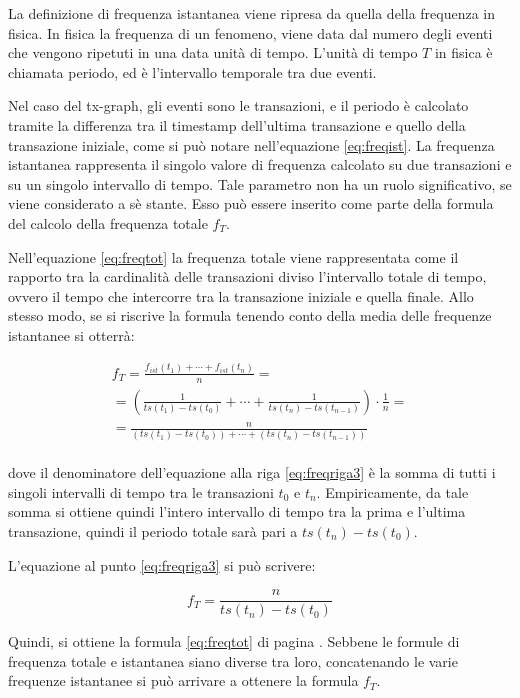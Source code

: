 La definizione di frequenza istantanea viene ripresa da quella della frequenza in fisica. In fisica la frequenza di un fenomeno, viene data dal numero degli eventi che vengono ripetuti in una data unità di tempo. L'unità di tempo $T$ in fisica è chiamata periodo, ed è l'intervallo temporale tra due eventi.

Nel caso del tx-graph, gli eventi sono le transazioni, e il periodo è calcolato tramite la differenza tra il timestamp dell'ultima transazione e quello della transazione iniziale, come si può notare nell'equazione \ref{eq:freqist}. La frequenza istantanea rappresenta il singolo valore di frequenza calcolato su due transazioni e su un singolo intervallo di tempo. Tale parametro non ha un ruolo significativo, se viene considerato a sè stante. Esso può essere inserito come parte della formula del calcolo della frequenza totale $f_T$. 

Nell'equazione \ref{eq:freqtot} la frequenza totale viene rappresentata come il rapporto tra la cardinalità delle transazioni diviso l'intervallo totale di tempo, ovvero il tempo che intercorre tra la transazione iniziale e quella finale. Allo stesso modo, se si riscrive la formula tenendo conto della media delle frequenze istantanee si otterrà:


\begin{eqnarray}
	f_T = \frac{f_{ist}(t_1)+\cdots+f_{ist}(t_n)}{n} = \label{eq:freqriga1} \\[20pt]
	= \left( \frac{1}{ts(t_1) - ts(t_0)}+\cdots+\frac{1}{ ts(t_n) - ts(t_{n-1})} \right) \cdot \frac{1}{n} = \label{eq:freqriga2}\\[20pt]
	= \frac{n}{( ts(t_1) - ts(t_0))+\cdots+(ts(t_n) - ts(t_{n-1}) )} \label{eq:freqriga3}
\end{eqnarray}
\\
dove il denominatore dell'equazione alla riga \ref{eq:freqriga3} è la somma di tutti i singoli intervalli di tempo tra le transazioni $t_0$ e $t_n$. Empiricamente, da tale somma si ottiene quindi l'intero intervallo di tempo tra la prima e l'ultima transazione, quindi il periodo totale sarà pari a $ts(t_n) - ts(t_0)$. 

L'equazione al punto \ref{eq:freqriga3} si può scrivere:

\begin{equation}
	f_T =  \frac{n}{ts(t_n) - ts(t_0)}
	\label{eq:freqfinal}
\end{equation}

Quindi, si ottiene la formula \ref{eq:freqtot} di pagina \pageref{eq:freqtot}. Sebbene le formule di frequenza totale e istantanea siano diverse tra loro, concatenando le varie frequenze istantanee si può arrivare a ottenere la formula $f_T$. 

